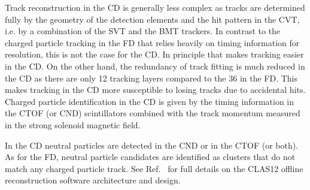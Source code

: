 \documentclass[final,3p,twocolumn]{elsarticle}
\begin{document}
Track reconstruction in the CD is generally less complex as tracks are determined fully by the geometry of the 
detection elements and the hit pattern in the CVT, i.e. by a combination of the SVT and the BMT trackers.  In
contrast to the charged particle tracking in the FD that relies heavily on timing information for resolution, this
is not the case for the CD. In principle that makes tracking easier in the CD. On the other hand, the redundancy
of track fitting is much reduced in the CD as there are only 12 tracking layers compared to the 36 in the FD. This
makes tracking in the CD more susceptible to losing tracks due to accidental hits. Charged particle identification
in the CD is given by the timing information in the CTOF (or CND) scintillators combined with the track momentum
measured in the strong solenoid magnetic field.

In the CD neutral particles are detected in the CND or in the CTOF (or both). As for the FD, neutral particle
candidates are identified as clusters that do not match any charged particle track. See Ref.~\cite{Software} for
full details on the CLAS12 offline reconstruction software architecture and design.
\end{document}
